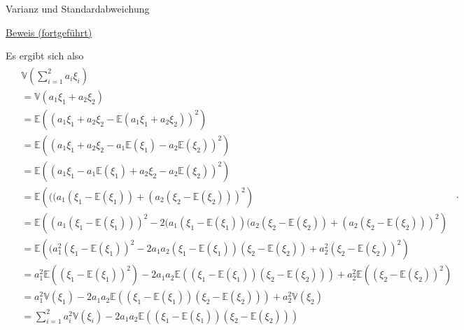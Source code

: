 \documentclass[
  8pt,
  ignorenonframetext,
]{beamer}
\begin{document}
\begin{frame}{Varianz und Standardabweichung}
\protect\hypertarget{varianz-und-standardabweichung-9}{}
\footnotesize

\underline{Beweis (fortgeführt)} \vspace{2mm}

Es ergibt sich also \begin{align*}
\begin{split}
& \mathbb{V}\left(\sum_{i=1}^2 a_i \xi_i\right)                                             \\
& = \mathbb{V}(a_1\xi_1 + a_2\xi_2) \\
& = \mathbb{E}\left((a_1\xi_1 + a_2\xi_2 - \mathbb{E}\left(a_1\xi_1 + a_2\xi_2\right))^2\right) \\
& = \mathbb{E}\left((a_1\xi_1 + a_2\xi_2 - a_1\mathbb{E}(\xi_1) - a_2\mathbb{E}(\xi_2))^2\right) \\
& = \mathbb{E}\left((a_1\xi_1 - a_1\mathbb{E}(\xi_1) + a_2\xi_2  - a_2\mathbb{E}(\xi_2))^2\right) \\
& = \mathbb{E}\left(((a_1(\xi_1 - \mathbb{E}(\xi_1)) + (a_2(\xi_2 - \mathbb{E}(\xi_2)))^2\right) \\
& = \mathbb{E}\left((a_1(\xi_1 - \mathbb{E}(\xi_1)))^2
                   - 2(a_1(\xi_1 - \mathbb{E}(\xi_1))(a_2(\xi_2 - \mathbb{E}(\xi_2))
                  + (a_2(\xi_2 - \mathbb{E}(\xi_2)))^2\right) \\
& = \mathbb{E}\left((a_1^2(\xi_1 - \mathbb{E}(\xi_1))^2
                   - 2a_1a_2(\xi_1 - \mathbb{E}(\xi_1))(\xi_2 - \mathbb{E}(\xi_2))
                  + a_2^2(\xi_2 - \mathbb{E}(\xi_2))^2\right) \\
& = a_1^2\mathbb{E}\left((\xi_1 - \mathbb{E}(\xi_1))^2\right)
   - 2a_1a_2\mathbb{E}\left((\xi_1 - \mathbb{E}(\xi_1))(\xi_2 - \mathbb{E}(\xi_2))\right)
   + a_2^2\mathbb{E}\left((\xi_2 - \mathbb{E}(\xi_2))^2\right) \\
& = a_1^2\mathbb{V}(\xi_1)
   - 2a_1a_2\mathbb{E}\left((\xi_1 - \mathbb{E}(\xi_1))(\xi_2 - \mathbb{E}(\xi_2))\right)
   + a_2^2\mathbb{V}(\xi_2) \\
& = \sum_{i=1}^2 a_i^2\mathbb{V}(\xi_i)
   - 2a_1a_2\mathbb{E}\left((\xi_1 - \mathbb{E}(\xi_1))(\xi_2 - \mathbb{E}(\xi_2))\right)
\end{split}.
\end{align*}
\end{frame}
\end{document}
